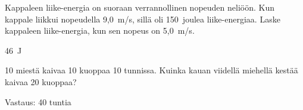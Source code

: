 \begin{tehtavasivu}
\begin{tehtava}
Kappaleen liike-energia on suoraan verrannollinen nopeuden neliöön. Kun kappale liikkui nopeudella 9,0~m/s, sillä oli 150~joulea liike-energiaa. Laske kappaleen liike-energia, kun sen nopeus on 5,0~m/s. 
\begin{vastaus}
46~J
\end{vastaus}
\end{tehtava}


\begin{tehtava}
	10 miestä kaivaa 10 kuoppaa 10 tunnissa. 
	Kuinka kauan viidellä miehellä kestää kaivaa 20 kuoppaa?
	
	\begin{vastaus}
		Vastaus: 40 tuntia
	\end{vastaus}	
\end{tehtava}

\end{tehtavasivu}
